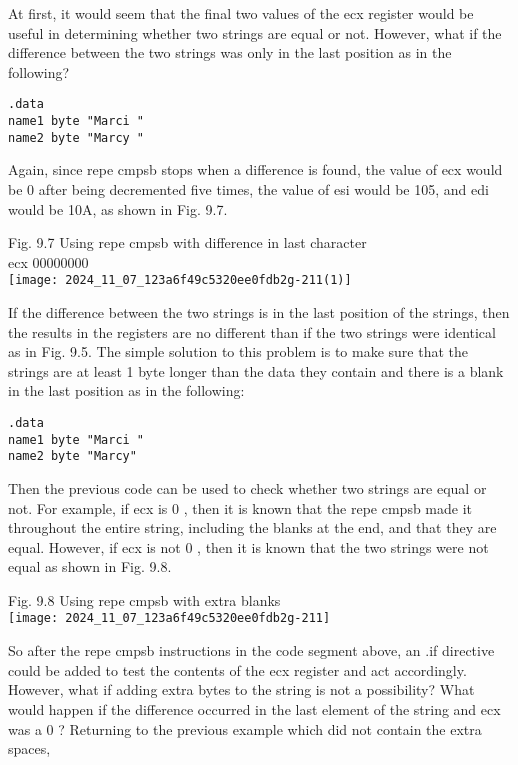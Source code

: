 \documentclass[10pt]{article}
\begin{document}
At first, it would seem that the final two values of the ecx register would be useful in determining whether two strings are equal or not. However, what if the difference between the two strings was only in the last position as in the following?

\begin{verbatim}
.data
name1 byte "Marci "
name2 byte "Marcy "
\end{verbatim}

Again, since repe cmpsb stops when a difference is found, the value of ecx would be 0 after being decremented five times, the value of esi would be 105, and edi would be 10A, as shown in Fig. 9.7.

Fig. 9.7 Using repe cmpsb with difference in last character\\
ecx 00000000\\
\texttt{[image: 2024\_11\_07\_123a6f49c5320ee0fdb2g-211(1)]}

If the difference between the two strings is in the last position of the strings, then the results in the registers are no different than if the two strings were identical as in Fig. 9.5. The simple solution to this problem is to make sure that the strings are at least 1 byte longer than the data they contain and there is a blank in the last position as in the following:

\begin{verbatim}
.data
name1 byte "Marci "
name2 byte "Marcy"
\end{verbatim}

Then the previous code can be used to check whether two strings are equal or not. For example, if ecx is 0 , then it is known that the repe cmpsb made it throughout the entire string, including the blanks at the end, and that they are equal. However, if ecx is not 0 , then it is known that the two strings were not equal as shown in Fig. 9.8.

Fig. 9.8 Using repe cmpsb with extra blanks\\
\texttt{[image: 2024\_11\_07\_123a6f49c5320ee0fdb2g-211]}

So after the repe cmpsb instructions in the code segment above, an .if directive could be added to test the contents of the ecx register and act accordingly. However, what if adding extra bytes to the string is not a possibility? What would happen if the difference occurred in the last element of the string and ecx was a 0 ? Returning to the previous example which did not contain the extra spaces,
\end{document}
